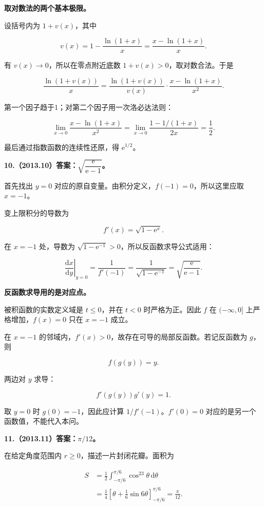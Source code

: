 \documentclass[UTF8,11pt,fontset=windows]{ctexart}
\begin{document}
\textbf{取对数法的两个基本极限。}

设括号内为 $1+v(x)$，其中

$$
v(x)=1-\frac{\ln(1+x)}x=\frac{x-\ln(1+x)}x.
$$

有 $v(x)\to0$，所以在零点附近底数 $1+v(x)>0$，取对数合法。于是

$$
\frac{\ln(1+v(x))}{x}
=\frac{\ln(1+v(x))}{v(x)}\cdot\frac{x-\ln(1+x)}{x^2}.
$$

第一个因子趋于1；对第二个因子用一次洛必达法则：

$$
\lim_{x\to0}\frac{x-\ln(1+x)}{x^2}
=\lim_{x\to0}\frac{1-1/(1+x)}{2x}
=\frac12.
$$

最后通过指数函数的连续性还原，得 $\mathrm e^{1/2}$。

\clearpage

\textbf{10.（2013.10）答案：$\sqrt{\dfrac{\mathrm e}{\mathrm e-1}}$。}

首先找出 $y=0$ 对应的原自变量。由积分定义，$f(-1)=0$，所以这里应取 $x=-1$。

变上限积分的导数为

$$
f'(x)=\sqrt{1-\mathrm e^x}.
$$

在 $x=-1$ 处，导数为 $\sqrt{1-\mathrm e^{-1}}>0$，所以反函数求导公式适用：

$$
\left.\frac{\mathrm dx}{\mathrm dy}\right|_{y=0}
=\frac1{f'(-1)}
=\frac1{\sqrt{1-\mathrm e^{-1}}}
=\sqrt{\frac{\mathrm e}{\mathrm e-1}}.
$$

\textbf{反函数求导用的是对应点。}

被积函数的实数定义域是 $t\le0$，并在 $t<0$ 时严格为正。因此 $f$ 在 $(-\infty,0]$ 上严格增加，$f(x)=0$ 只在 $x=-1$ 成立。

在 $x=-1$ 的邻域内，$f'(x)>0$，故存在可导的局部反函数。若记反函数为 $g$，则

$$
f(g(y))=y.
$$

两边对 $y$ 求导：

$$
f'(g(y))g'(y)=1.
$$

取 $y=0$ 时 $g(0)=-1$，因此应计算 $1/f'(-1)$。$f'(0)=0$ 对应的是另一个函数值，不能代入本问。

\clearpage

\textbf{11.（2013.11）答案：$\pi/12$。}

在给定角度范围内 $r\ge0$，描述一片封闭花瓣。面积为

$$
\begin{aligned}
S&=\frac12\int_{-\pi/6}^{\pi/6}\cos^23\theta\,\mathrm d\theta\\
&=\frac14\left[\theta+\frac16\sin6\theta\right]_{-\pi/6}^{\pi/6}
=\frac\pi{12}.
\end{aligned}
$$
\end{document}
